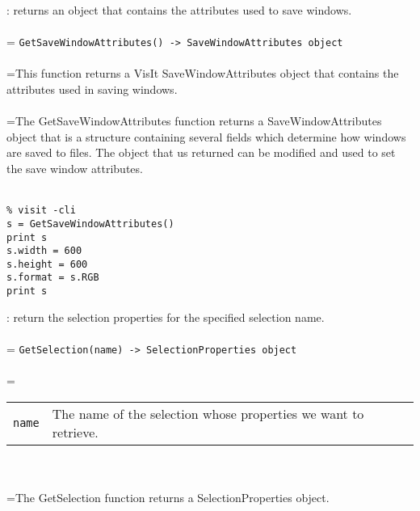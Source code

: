 \documentclass[10pt,a4paper]{report}
\begin{document}
{}
: returns an object that contains the attributes used to save windows.\\[-3mm]

 \\ 
\hangindent=\parindent 
\verb!GetSaveWindowAttributes() -> SaveWindowAttributes object!\\ [-3mm]

 \\ 
\hangindent=\parindent This function returns a VisIt SaveWindowAttributes object that contains the attributes used in saving windows. \\[-3mm] 

 \\ 
\hangindent=\parindent The GetSaveWindowAttributes function returns a SaveWindowAttributes object that is a structure containing several fields which determine how windows are saved to files. The object that us returned can be modified and used to set the save window attributes. \\[-3mm] 

\\[-6mm]
\begin{verbatim}% visit -cli
s = GetSaveWindowAttributes()
print s
s.width = 600
s.height = 600
s.format = s.RGB
print s
\end{verbatim}
\newpage


{}
: return the selection properties for the specified selection name.\\[-3mm]

 \\ 
\hangindent=\parindent 
\verb!GetSelection(name) -> SelectionProperties object!\\ [-3mm]

 \\ 
\hangindent=\parindent 
\begin{tabular}{lp{9cm}}
\verb!name! & The name of the selection whose properties we want to retrieve. \\
\end{tabular} \\[-2mm]


 \\ 
\hangindent=\parindent The GetSelection function returns a SelectionProperties object. \\[-3mm] 
\end{document}
